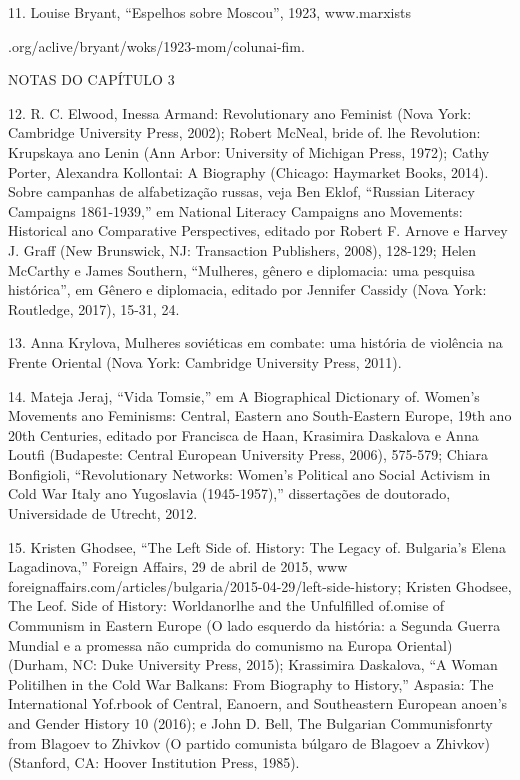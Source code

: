  \par 
11. Louise Bryant, “Espelhos sobre Moscou”, 1923, www.marxists
 \par 
.org/aclive/bryant/woks/1923-mom/colunai-fim.
 \par 
NOTAS DO CAPÍTULO {\color{blue}3}
 \par 
12. R. C. Elwood, Inessa Armand: Revolutionary ano Feminist (Nova York: Cambridge University Press, 2002); Robert McNeal, bride of. lhe Revolution: Krupskaya ano Lenin (Ann Arbor: University of Michigan Press, 1972); Cathy Porter, Alexandra Kollontai: A Biography (Chicago: Haymarket Books, 2014). Sobre campanhas de alfabetização russas, veja Ben Eklof, “Russian Literacy Campaigns 1861-1939,” em National Literacy Campaigns ano Movements: Historical ano Comparative Perspectives, editado por Robert F. Arnove e Harvey J. Graff (New Brunswick, NJ: Transaction Publishers, 2008), 128-129; Helen McCarthy e James Southern, “Mulheres, gênero e diplomacia: uma pesquisa histórica”, em Gênero e diplomacia, editado por Jennifer Cassidy (Nova York: Routledge, 2017), 15-31, {\color{blue}24}.
 \par 
13. Anna Krylova, Mulheres soviéticas em combate: uma história de violência na Frente Oriental (Nova York: Cambridge University Press, 2011).
 \par 
14. Mateja Jeraj, “Vida Tomsi¢,” em A Biographical Dictionary of. Women’s Movements ano Feminisms: Central, Eastern ano South-Eastern Europe, 19th ano 20th Centuries, editado por Francisca de Haan, Krasimira Daskalova e Anna Loutfi (Budapeste: Central European University Press, 2006), 575-579; Chiara Bonfigioli, “Revolutionary Networks: Women’s Political ano Social Activism in Cold War Italy ano Yugoslavia (1945-1957),” dissertações de doutorado, Universidade de Utrecht, 2012.
 \par 
15. Kristen Ghodsee, “The Left Side of. History: The Legacy of. Bulgaria’s Elena Lagadinova,” Foreign Affairs, {\color{blue}29} de abril de 2015, www foreignaffairs.com/articles/bulgaria/2015-04-29/left-side-history; Kristen Ghodsee, The Leof. Side of History: Worldanorlhe and the Unfulfilled of.omise of Communism in Eastern Europe (O lado esquerdo da história: a Segunda Guerra Mundial e a promessa não cumprida do comunismo na Europa Oriental) (Durham, NC: Duke University Press, 2015); Krassimira Daskalova, “A Woman Politilhen in the Cold War Balkans: From Biography to History,” Aspasia: The International Yof.rbook of Central, Eanoern, and Southeastern European anoen’s and Gender History {\color{blue}10} (2016); e John D. Bell, The Bulgarian Communisfonrty from Blagoev to Zhivkov (O partido comunista búlgaro de Blagoev a Zhivkov) (Stanford, CA: Hoover Institution Press, 1985).
